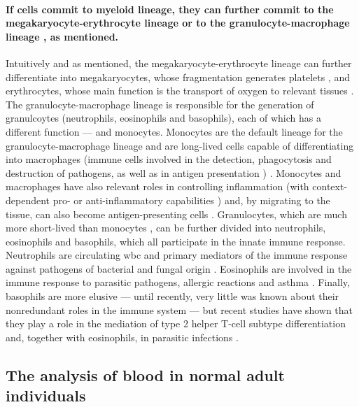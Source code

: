 \paragraph{If cells commit to myeloid lineage, they can further commit to the megakaryocyte-erythrocyte lineage or to the granulocyte-macrophage lineage \cite{Akashi2000-ck}, as mentioned.} Intuitively and as mentioned, the megakaryocyte-erythrocyte lineage can further differentiate into megakaryocytes, whose fragmentation generates platelets \cite{Wright1906-af}, and erythrocytes, whose main function is the transport of oxygen to relevant tissues \cite{Jensen2009-be}. The granulocyte-macrophage lineage is responsible for the generation of granulcoytes (neutrophils, eosinophils and basophils), each of which has a different function --- and monocytes. Monocytes are the default lineage for the granulocyte-macrophage lineage and are long-lived cells capable of differentiating into macrophages (immune cells involved in the detection, phagocytosis and destruction of pathogens, as well as in antigen presentation \cite{Mills2012-rc}) \cite{Jakubzick2017-is}. Monocytes and macrophages have also relevant roles in controlling inflammation (with context-dependent pro- or anti-inflammatory capabilities \cite{Rivollier2012-we,Bain2013-qe}) and, by migrating to the tissue, can also become antigen-presenting cells \cite{Jakubzick2013-az,Plantinga2013-kn}. Granulocytes, which are much more short-lived than monocytes \cite{Athens1961-cl}, can be further divided into neutrophils, eosinophils and basophils, which all participate in the innate immune response. Neutrophils are circulating \ac{wbc} and primary mediators of the immune response against pathogens of bacterial and fungal origin \cite{Malech2014-dm}. Eosinophils are involved in the immune response to parasitic pathogens, allergic reactions and asthma \cite{Uhm2012-ja,Huang2016-br}. Finally, basophils are more elusive --- until recently, very little was known about their nonredundant roles in the immune system \cite{Miyake2017-rh,Karasuyama2011-ws} --- but recent studies have shown that they play a role in the mediation of type 2 helper T-cell subtype differentiation \cite{Hida2005-lj,Oh2007-yr} and, together with eosinophils, in parasitic infections \cite{Karasuyama2011-ws,Huang2016-br}.

\subsection{The analysis of blood in normal adult individuals}

